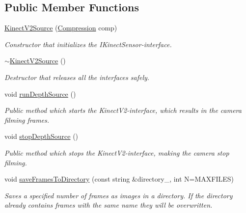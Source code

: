 \subsection*{Public Member Functions}
\begin{DoxyCompactItemize}
\item 
\hyperlink{class_kinect_v2_source_aa9c02adca487952da0e24e769e06ea87}{Kinect\+V2\+Source} (\hyperlink{_compression_strategy_8h_a56a83bf6847f4801f4205eb4be237ccf}{Compression} comp)
\begin{DoxyCompactList}\small\item\em Constructor that initializes the I\+Kinect\+Sensor-\/interface. \end{DoxyCompactList}\item 
\hypertarget{class_kinect_v2_source_a9859a72ce30b8b552e90f479bd5609cc}{\hyperlink{class_kinect_v2_source_a9859a72ce30b8b552e90f479bd5609cc}{$\sim$\+Kinect\+V2\+Source} ()}\label{class_kinect_v2_source_a9859a72ce30b8b552e90f479bd5609cc}

\begin{DoxyCompactList}\small\item\em Destructor that releases all the interfaces safely. \end{DoxyCompactList}\item 
\hypertarget{class_kinect_v2_source_aed2fd3bb2b33636b183ff217bf815f38}{void \hyperlink{class_kinect_v2_source_aed2fd3bb2b33636b183ff217bf815f38}{run\+Depth\+Source} ()}\label{class_kinect_v2_source_aed2fd3bb2b33636b183ff217bf815f38}

\begin{DoxyCompactList}\small\item\em Public method which starts the Kinect\+V2-\/interface, which results in the camera filming frames. \end{DoxyCompactList}\item 
\hypertarget{class_kinect_v2_source_a5f492aefe4035084fbb9ca92cc135e1b}{void \hyperlink{class_kinect_v2_source_a5f492aefe4035084fbb9ca92cc135e1b}{stop\+Depth\+Source} ()}\label{class_kinect_v2_source_a5f492aefe4035084fbb9ca92cc135e1b}

\begin{DoxyCompactList}\small\item\em Public method which stops the Kinect\+V2-\/interface, making the camera stop filming. \end{DoxyCompactList}\item 
void \hyperlink{class_kinect_v2_source_a3fa31b0766bb3e9037bb72ef7e4baea7}{save\+Frames\+To\+Directory} (const string \&directory\+\_\+, int N=M\+A\+X\+F\+I\+L\+E\+S)
\begin{DoxyCompactList}\small\item\em Saves a specified number of frames as images in a directory. If the directory already contains frames with the same name they will be overwritten. \end{DoxyCompactList}\end{DoxyCompactItemize}
